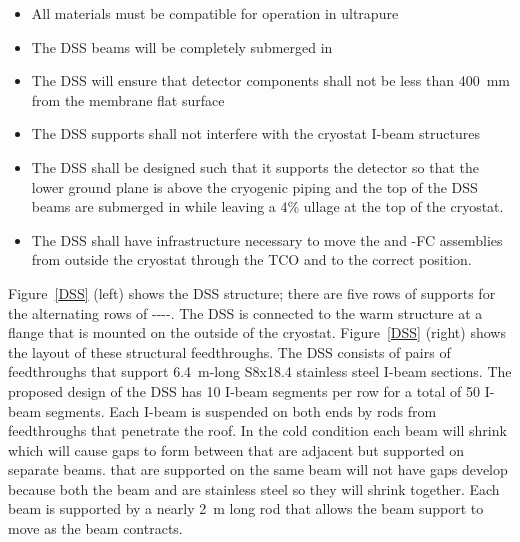\begin{itemize}
\item All materials must be compatible for operation in ultrapure 
\item The DSS beams will be completely submerged in 
\item The DSS will ensure that detector components shall not be less than \SI{400}{mm} from the membrane flat surface
\item The DSS supports shall not interfere with the cryostat I-beam structures
\item The DSS shall be designed such that it supports the detector so that the lower ground plane is above the cryogenic piping and the top of the DSS beams are submerged in  while leaving a 4\% ullage at the top of the cryostat.
\item The DSS shall have infrastructure necessary to move the  and -FC assemblies from outside the cryostat through the TCO and to the correct position.
\end{itemize}

Figure~\ref{DSS} (left) shows the DSS structure; there are five rows
of supports for the alternating rows
of ----.  The
DSS is connected to the warm structure at a flange that is mounted on
the outside of the cryostat.  Figure~\ref{DSS} (right) shows the
layout of these structural feedthroughs.  The DSS consists of pairs of
feedthroughs that support \SI{6.4}{m}-long S8x18.4 stainless steel I-beam
sections. The proposed design of the DSS has \num{10} I-beam segments per
row for a total of \num{50} I-beam segments. Each I-beam is suspended on
both ends by rods from feedthroughs that penetrate the roof.  In the
cold condition each beam will shrink which will cause gaps to form
between  that are adjacent but supported on separate
beams.   that are supported on the same beam will not have
gaps develop because both the beam and  are stainless
steel so they will shrink together.  Each beam is supported by a
nearly \SI{2}{m} long rod that allows the beam support to move as the beam
contracts.

